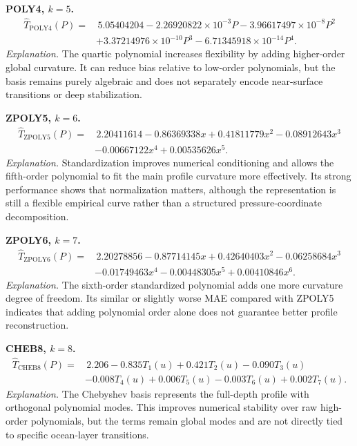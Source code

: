 \documentclass[10pt]{article}
\begin{document}
\vspace{0.35em}
\noindent\textbf{POLY4, $k=5$.}
\[
\begin{aligned}
\hat{T}_{\mathrm{POLY4}}(P)=&\,5.05404204
-2.26920822\times10^{-3}P
-3.96617497\times10^{-8}P^2 \\
&+3.37214976\times10^{-10}P^3
-6.71345918\times10^{-14}P^4.
\end{aligned}
\]
\noindent\emph{Explanation.}
The quartic polynomial increases flexibility by adding higher-order global curvature. It can reduce bias relative to low-order polynomials, but the basis remains purely algebraic and does not separately encode near-surface transitions or deep stabilization.

\vspace{0.35em}
\noindent\textbf{ZPOLY5, $k=6$.}
\[
\begin{aligned}
\hat{T}_{\mathrm{ZPOLY5}}(P)=&\,2.20411614
-0.86369338x
+0.41811779x^2
-0.08912643x^3 \\
&-0.00667122x^4
+0.00535626x^5.
\end{aligned}
\]
\noindent\emph{Explanation.}
Standardization improves numerical conditioning and allows the fifth-order polynomial to fit the main profile curvature more effectively. Its strong performance shows that normalization matters, although the representation is still a flexible empirical curve rather than a structured pressure-coordinate decomposition.

\vspace{0.35em}
\noindent\textbf{ZPOLY6, $k=7$.}
\[
\begin{aligned}
\hat{T}_{\mathrm{ZPOLY6}}(P)=&\,2.20278856
-0.87714145x
+0.42640403x^2
-0.06258684x^3 \\
&-0.01749463x^4
-0.00448305x^5
+0.00410846x^6.
\end{aligned}
\]
\noindent\emph{Explanation.}
The sixth-order standardized polynomial adds one more curvature degree of freedom. Its similar or slightly worse MAE compared with ZPOLY5 indicates that adding polynomial order alone does not guarantee better profile reconstruction.

\vspace{0.35em}
\noindent\textbf{CHEB8, $k=8$.}
\[
\begin{aligned}
\hat{T}_{\mathrm{CHEB8}}(P)=&\,2.206
-0.835T_1(u)
+0.421T_2(u)
-0.090T_3(u) \\
&-0.008T_4(u)
+0.006T_5(u)
-0.003T_6(u)
+0.002T_7(u).
\end{aligned}
\]
\noindent\emph{Explanation.}
The Chebyshev basis represents the full-depth profile with orthogonal polynomial modes. This improves numerical stability over raw high-order polynomials, but the terms remain global modes and are not directly tied to specific ocean-layer transitions.
\end{document}
